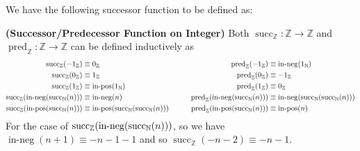 We have the following successor function to be defined as:

\begin{definition}{\textbf{(Successor/Predecessor Function on Integer)}}
    \label{def:succ-pred-int}
    Both $\operatorname{succ}_\mathbb{Z}:\mathbb{Z}\rightarrow\mathbb{Z}$ and $\operatorname{pred}_\mathbb{Z}:\mathbb{Z}\rightarrow\mathbb{Z}$ can be defined inductively as
    \begin{equation*}
    \begin{aligned} 
        \operatorname{succ}_\mathbb{Z}(-1_\mathbb{Z}) &\equiv0_\mathbb{Z} \\ 
        \operatorname{succ}_\mathbb{Z}(0_\mathbb{Z}) &\equiv 1_\mathbb{Z} \\ 
        \operatorname{succ}_\mathbb{Z}(1_\mathbb{Z}) &\equiv \operatorname{in-pos}(1_\mathbb{N}) \\ 
        \operatorname{succ}_\mathbb{Z}(\operatorname{in-neg}(\operatorname{succ}_\mathbb{N}(n))) &\equiv\operatorname{in-neg}(n) \\ 
        \operatorname{succ}_\mathbb{Z}(\operatorname{in-pos}(\operatorname{succ}_\mathbb{N}(n))) &\equiv\operatorname{in-pos}(\operatorname{succ}_\mathbb{N}(\operatorname{succ}_\mathbb{N}(n))) \\ 
    \end{aligned} \qquad \quad 
    \begin{aligned} 
        \operatorname{pred}_\mathbb{Z}(-1_\mathbb{Z}) &\equiv \operatorname{in-neg}(1_\mathbb{N}) \\ 
        \operatorname{pred}_\mathbb{Z}(0_\mathbb{Z}) &\equiv -1_\mathbb{Z} \\ 
        \operatorname{pred}_\mathbb{Z}(1_\mathbb{Z}) &\equiv 0_\mathbb{Z} \\ 
        \operatorname{pred}_\mathbb{Z}(\operatorname{in-neg}(\operatorname{succ}_\mathbb{N}(n))) &\equiv\operatorname{in-neg}(\operatorname{succ}_\mathbb{N}(\operatorname{succ}_\mathbb{N}(n))) \\ 
        \operatorname{pred}_\mathbb{Z}(\operatorname{in-pos}(\operatorname{succ}_\mathbb{N}(n))) &\equiv\operatorname{in-pos}(n) \\ 
    \end{aligned}
    \end{equation*}
    For the case of $\operatorname{succ}_\mathbb{Z}(\operatorname{in-neg}(\operatorname{succ}_\mathbb{N}(n)))$, so we have $\operatorname{in-neg}(n+1)\equiv -n-1-1$ and so $\operatorname{succ}_\mathbb{Z}(-n-2)\equiv -n-1$.
\end{definition}

